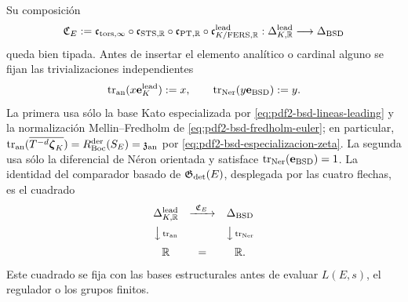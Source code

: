 Su composición
\begin{equation}\label{eq:pdf2-bsd-comparador-total}
 \mathfrak C_E:=
 \mathfrak c_{\rm tors,\infty}\circ
 \mathfrak c_{{\rm STS},\mathbb R}\circ
 \mathfrak c_{{\rm PT},\mathbb R}\circ
 \mathfrak c_{K/{\rm FERS},\mathbb R}^{\rm lead}:
 \Delta_{K,\mathbb R}^{\rm lead}
 \longrightarrow\Delta_{\rm BSD}
\end{equation}
queda bien tipada. Antes de insertar el elemento analítico o cardinal alguno
se fijan las trivializaciones independientes
\begin{equation}\label{eq:pdf2-bsd-trivializaciones-independientes}
 \operatorname{tr}_{\rm an}(x\mathbf e_K^{\rm lead}):=x,
 \qquad
 \operatorname{tr}_{\rm Ner}(y\mathbf e_{\rm BSD}):=y.
\end{equation}
La primera usa sólo la base Kato especializada por
\eqref{eq:pdf2-bsd-lineas-leading} y la normalización Mellin--Fredholm de
\eqref{eq:pdf2-bsd-fredholm-euler}; en particular,
$\operatorname{tr}_{\rm an}
(\overline{T^{-d}\boldsymbol\zeta_K})
=R_{\rm Boc}^{\rm der}(S_E)=\mathfrak z_{\rm an}$ por
\eqref{eq:pdf2-bsd-especializacion-zeta}. La segunda usa sólo la diferencial
de Néron orientada y satisface
$\operatorname{tr}_{\rm Ner}(\mathbf e_{\rm BSD})=1$. La identidad del
comparador basado de $\mathfrak G_{\rm det}(E)$, desplegada por las cuatro
flechas, es el
cuadrado
\begin{equation}\label{eq:pdf2-bsd-cuadrado-trivializaciones}
\begin{array}{ccc}
 \Delta_{K,\mathbb R}^{\rm lead}
   &\xrightarrow{\ \mathfrak C_E\ }&\Delta_{\rm BSD}\\[2mm]
 \big\downarrow\scriptstyle\operatorname{tr}_{\rm an}
   &&\big\downarrow\scriptstyle\operatorname{tr}_{\rm Ner}\\[2mm]
 \mathbb R&=&\mathbb R.
\end{array}
\end{equation}
Este cuadrado se fija con las bases estructurales antes de evaluar
$L(E,s)$, el regulador o los grupos finitos.

